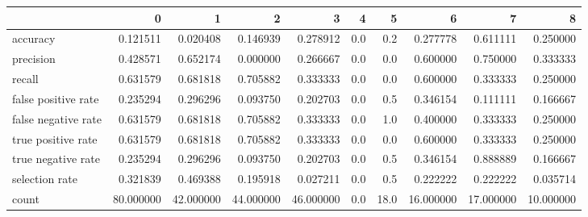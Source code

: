 \begin{tabular}{lrrrrrrrrr}
\toprule
{} &          0 &          1 &          2 &          3 &    4 &     5 &          6 &          7 &          8 \\
\midrule
accuracy            &   0.121511 &   0.020408 &   0.146939 &   0.278912 &  0.0 &   0.2 &   0.277778 &   0.611111 &   0.250000 \\
precision           &   0.428571 &   0.652174 &   0.000000 &   0.266667 &  0.0 &   0.0 &   0.600000 &   0.750000 &   0.333333 \\
recall              &   0.631579 &   0.681818 &   0.705882 &   0.333333 &  0.0 &   0.0 &   0.600000 &   0.333333 &   0.250000 \\
false positive rate &   0.235294 &   0.296296 &   0.093750 &   0.202703 &  0.0 &   0.5 &   0.346154 &   0.111111 &   0.166667 \\
false negative rate &   0.631579 &   0.681818 &   0.705882 &   0.333333 &  0.0 &   1.0 &   0.400000 &   0.333333 &   0.250000 \\
true positive rate  &   0.631579 &   0.681818 &   0.705882 &   0.333333 &  0.0 &   0.0 &   0.600000 &   0.333333 &   0.250000 \\
true negative rate  &   0.235294 &   0.296296 &   0.093750 &   0.202703 &  0.0 &   0.5 &   0.346154 &   0.888889 &   0.166667 \\
selection rate      &   0.321839 &   0.469388 &   0.195918 &   0.027211 &  0.0 &   0.5 &   0.222222 &   0.222222 &   0.035714 \\
count               &  80.000000 &  42.000000 &  44.000000 &  46.000000 &  0.0 &  18.0 &  16.000000 &  17.000000 &  10.000000 \\
\bottomrule
\end{tabular}
